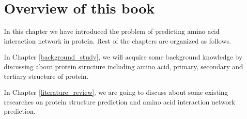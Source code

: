 \section{Overview of this book}
In this chapter we have introduced the problem of predicting amino acid interaction network in protein. Rest of the chapters are organized as follows.

In Chapter \ref{background_study}, we will acquire some background knowledge by discussing about protein structure including amino acid, primary, secondary and tertiary structure of protein.

In Chapter \ref{literature_review}, we are going to discuss about some existing researches on protein structure prediction and amino acid interaction network prediction.


